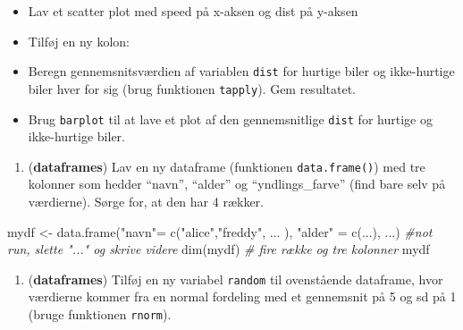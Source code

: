 \documentclass[
]{book}
\newenvironment{Shaded}{\begin{snugshade}}{\end{snugshade}}
\newcommand{\CommentTok}[1]{\textcolor[rgb]{0.56,0.35,0.01}{\textit{#1}}}
\newcommand{\DecValTok}[1]{\textcolor[rgb]{0.00,0.00,0.81}{#1}}
\newcommand{\FunctionTok}[1]{\textcolor[rgb]{0.00,0.00,0.00}{#1}}
\newcommand{\NormalTok}[1]{#1}
\newcommand{\OtherTok}[1]{\textcolor[rgb]{0.56,0.35,0.01}{#1}}
\newcommand{\SpecialCharTok}[1]{\textcolor[rgb]{0.00,0.00,0.00}{#1}}
\newcommand{\StringTok}[1]{\textcolor[rgb]{0.31,0.60,0.02}{#1}}
\providecommand{\tightlist}{%
  \setlength{\itemsep}{0pt}\setlength{\parskip}{0pt}}
\begin{document}
\begin{itemize}
\tightlist
\item
  Lav et scatter plot med speed på x-aksen og dist på y-aksen
\item
  Tilføj en ny kolon:
\end{itemize}

\begin{Shaded}
\end{Shaded}

\begin{itemize}
\tightlist
\item
  Beregn gennemsnitsværdien af variablen \texttt{dist} for hurtige biler og ikke-hurtige biler hver for sig (brug funktionen \texttt{tapply}). Gem resultatet.
\item
  Brug \texttt{barplot} til at lave et plot af den gennemsnitlige \texttt{dist} for hurtige og ikke-hurtige biler.
\end{itemize}

\begin{enumerate}
\def\labelenumi{\arabic{enumi})}
\setcounter{enumi}{4}
\tightlist
\item
  (\textbf{dataframes}) Lav en ny dataframe (funktionen \texttt{data.frame()}) med tre kolonner som hedder ``navn'', ``alder'' og ``yndlings\_farve'' (find bare selv på værdierne). Sørge for, at den har 4 rækker.
\end{enumerate}

\begin{Shaded}
\begin{Highlighting}[]
\NormalTok{mydf }\OtherTok{\textless{}{-}} \FunctionTok{data.frame}\NormalTok{(}\StringTok{"navn"}\OtherTok{=} \FunctionTok{c}\NormalTok{(}\StringTok{"alice"}\NormalTok{,}\StringTok{"freddy"}\NormalTok{, ... ), }\StringTok{"alder"} \OtherTok{=} \FunctionTok{c}\NormalTok{(...), ...) }\CommentTok{\#not run, slette "..." og skrive videre}
\FunctionTok{dim}\NormalTok{(mydf) }\CommentTok{\# fire række og tre kolonner}
\NormalTok{mydf}
\end{Highlighting}
\end{Shaded}

\begin{enumerate}
\def\labelenumi{\arabic{enumi})}
\setcounter{enumi}{5}
\tightlist
\item
  (\textbf{dataframes}) Tilføj en ny variabel \texttt{random} til ovenstående dataframe, hvor værdierne kommer fra en normal fordeling med et gennemsnit på 5 og sd på 1 (bruge funktionen \texttt{rnorm}).
\end{enumerate}
\end{document}
